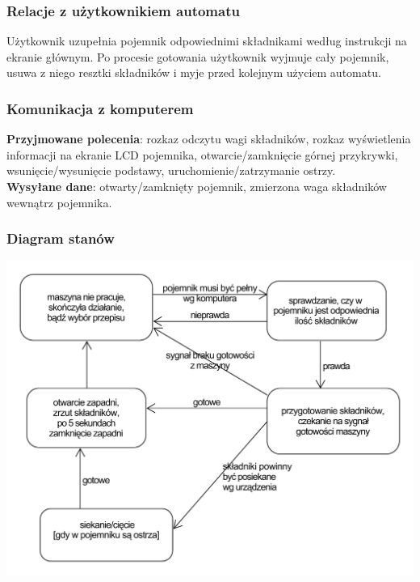 \documentclass[12pt,a4paper,notitlepage]{article}
\begin{document}
\subsubsection{Relacje z użytkownikiem automatu}
Użytkownik uzupełnia pojemnik odpowiednimi składnikami według instrukcji na ekranie głównym. Po procesie gotowania użytkownik wyjmuje cały pojemnik, usuwa z niego resztki składników i myje przed kolejnym użyciem automatu.

\subsubsection{Komunikacja z komputerem}
\textbf{Przyjmowane polecenia}: rozkaz odczytu wagi składników, rozkaz wyświetlenia informacji na ekranie LCD pojemnika, otwarcie/zamknięcie górnej przykrywki, wsunięcie/wysunięcie podstawy, uruchomienie/zatrzymanie ostrzy.\\
\textbf{Wysyłane dane}: otwarty/zamknięty pojemnik, zmierzona waga składników wewnątrz pojemnika.

\subsubsection{Diagram stanów}
\includegraphics[width=\textwidth,height=\textheight,keepaspectratio=true]{Diagram-stanow-pojemnik.pdf}
\end{document}
